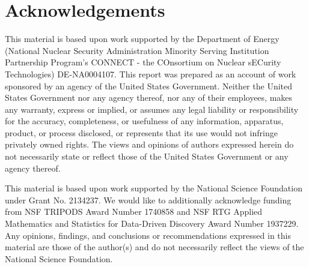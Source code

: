 

\section*{Acknowledgements}

This material is based upon work supported by the Department of Energy (National Nuclear Security Administration Minority Serving Institution Partnership Program's CONNECT - the COnsortium on Nuclear sECurity Technologies) DE-NA0004107.
This report was prepared as an account of work sponsored by an agency of the United States Government.
Neither the United States Government nor any agency thereof, nor any of their employees, makes any warranty, express or implied, or assumes any legal liability or responsibility for the accuracy, completeness, or usefulness of any information, apparatus, product, or process disclosed, or represents that its use would not infringe privately owned rights. The views and opinions of authors expressed herein do not necessarily state or reflect those of the United States Government or any agency thereof.

This material is based upon work supported by the National Science Foundation under Grant No. 2134237. We would like to additionally acknowledge funding from NSF TRIPODS Award Number 1740858 and NSF RTG Applied Mathematics and Statistics for Data-Driven Discovery Award Number 1937229. Any opinions, findings, and conclusions or recommendations expressed in this material are those of the author(s) and do not necessarily reflect the views of the National Science Foundation.

